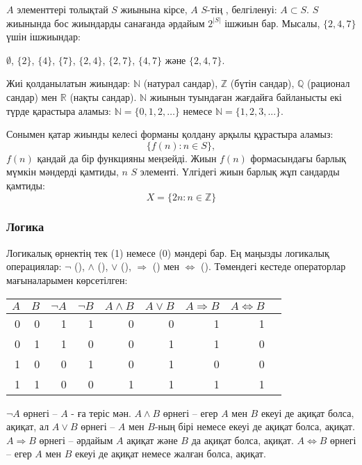 $A$ элементтері толықтай $S$ жиынына кірсе,
$A$ $S$-тің ,
белгіленуі: $A \subset S$.
$S$ жиынында бос жиындарды санағанда 
әрдайым $2^{|S|}$ ішжиын бар.
Мысалы, $\{2,4,7\}$ үшін ішжиындар:
\begin{center}
$\emptyset$,
$\{2\}$, $\{4\}$, $\{7\}$, $\{2,4\}$, $\{2,7\}$, $\{4,7\}$ және $\{2,4,7\}$.
\end{center}

Жиі қолданылатын жиындар:
$\mathbb{N}$ (натурал сандар),
$\mathbb{Z}$ (бүтін сандар),
$\mathbb{Q}$ (рационал сандар) мен
$\mathbb{R}$ (нақты сандар).
$\mathbb{N}$ жиынын туындаған жағдайға байланысты
екі түрде қарастыра аламыз:
$\mathbb{N}=\{0,1,2,\ldots\}$
немесе $\mathbb{N}=\{1,2,3,...\}$.

Сонымен қатар жиынды келесі форманы қолдану арқылы құрастыра аламыз:
\[\{f(n) : n \in S\},\]
$f(n)$ қандай да бір функцияны меңзейді.
Жиын $f(n)$ формасындағы барлық мүмкін мәндерді қамтиды,
$n$ $S$ элементі.
Үлгідегі жиын барлық жұп сандарды қамтиды:
\[X=\{2n : n \in \mathbb{Z}\}\]

\subsubsection{Логика}


Логикалық өрнектің тек  (1)
немесе  (0) мәндері бар.
Ең маңызды логикалық операциялар:
$\lnot$ (),
$\land$ (),
$\lor$ (),
$\Rightarrow$ () мен
$\Leftrightarrow$ ().
Төмендегі кестеде операторлар мағыналарымен көрсетілген:

\begin{center}
\begin{tabular}{rr|rrrrrrr}
$A$ & $B$ & $\lnot A$ & $\lnot B$ & $A \land B$ & $A \lor B$ & $A \Rightarrow B$ & $A \Leftrightarrow B$ \\
\hline
0 & 0 & 1 & 1 & 0 & 0 & 1 & 1 \\
0 & 1 & 1 & 0 & 0 & 1 & 1 & 0 \\
1 & 0 & 0 & 1 & 0 & 1 & 0 & 0 \\
1 & 1 & 0 & 0 & 1 & 1 & 1 & 1 \\
\end{tabular}
\end{center}

$\lnot A$ өрнегі -- $A$ - ға теріс мән.
$A \land B$ өрнегі -- егер $A$ мен $B$
екеуі де ақиқат болса, ақиқат, ал $A \lor B$ өрнегі --
$A$ мен $B$-ның бірі немесе екеуі де ақиқат болса,
ақиқат.
$A \Rightarrow B$ өрнегі --
әрдайым $A$ ақиқат және $B$ да ақиқат болса,
ақиқат. $A \Leftrightarrow B$ өрнегі --
егер $A$ мен $B$ екеуі де ақиқат немесе жалған болса, ақиқат.

